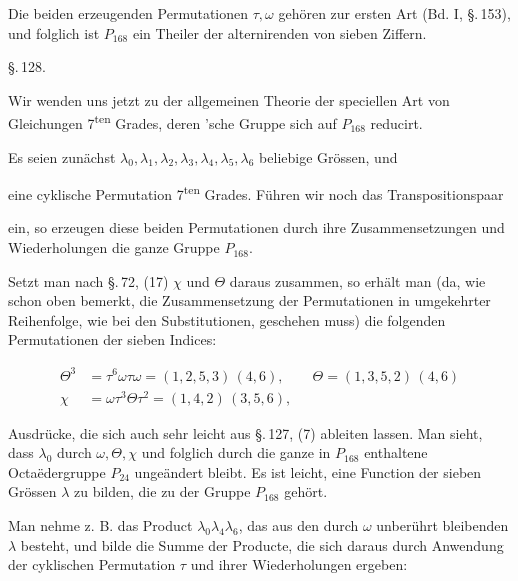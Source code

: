 Die beiden erzeugenden Permutationen $\tau, \omega$ gehören zur ersten Art (Bd. I, \S.\,153), und folglich ist $P_{168}$ ein Theiler der alternirenden  von sieben Ziffern.

\begin{center}
\S.\,128.

\end{center}

Wir wenden uns jetzt zu der allgemeinen Theorie der speciellen Art von Gleichungen 7\textsuperscript{ten} Grades, deren 'sche Gruppe sich auf $P_{168}$ reducirt.

Es seien zunächst $\lambda_0, \lambda_1, \lambda_2, \lambda_3, \lambda_4, \lambda_5, \lambda_6$ beliebige Grössen, und


eine cyklische Permutation 7\textsuperscript{ten} Grades. Führen wir noch das Transpositionspaar


ein, so erzeugen diese beiden Permutationen durch ihre Zusammensetzungen und Wiederholungen die ganze Gruppe $P_{168}$.

Setzt man nach \S.\,72, (17) $\chi$ und $\Theta$ daraus zusammen, so erhält man (da, wie schon oben bemerkt, die Zusammensetzung der Permutationen in umgekehrter Reihenfolge, wie bei den Substitutionen, geschehen muss) die folgenden Permutationen der sieben Indices:

\[
\begin{aligned}
\Theta^3 &= \tau^6 \omega \tau \omega = (1, 2, 5, 3)\,(4, 6),
\qquad \Theta = (1, 3, 5, 2)\,(4, 6) \\
\chi &= \omega \tau^3 \Theta \tau^2 = (1, 4, 2)\,(3, 5, 6),
\end{aligned}
\]

Ausdrücke, die sich auch sehr leicht aus \S.\,127, (7) ableiten lassen. Man sieht, dass $\lambda_0$ durch $\omega, \Theta, \chi$ und folglich durch die ganze in $P_{168}$ enthaltene Octa\"edergruppe $P_{24}$ ungeändert bleibt. Es ist leicht, eine Function der sieben Grössen $\lambda$ zu bilden, die zu der Gruppe $P_{168}$ gehört.

Man nehme z. B. das Product $\lambda_0 \lambda_4 \lambda_6$, das aus den durch $\omega$ unberührt bleibenden $\lambda$ besteht, und bilde die Summe der Producte, die sich daraus durch Anwendung der cyklischen Permutation $\tau$ und ihrer Wiederholungen ergeben:


